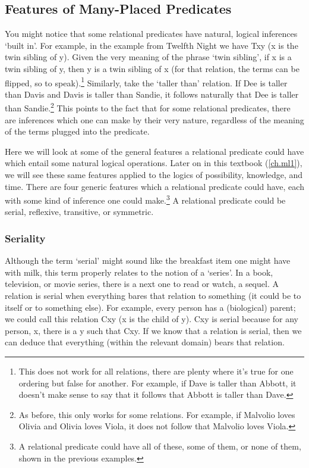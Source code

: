 \subsection{Features of Many-Placed Predicates}\label{ss.featuresmanyplaced}

You might notice that some relational predicates have natural, logical inferences `built in'. For example, in the example from Twelfth Night we have Txy (x is the twin sibling of y). Given the very meaning of the phrase `twin sibling', if x is a twin sibling of y, then y is a twin sibling of x (for that relation, the terms can be flipped, so to speak).\footnote{This does not work for all relations, there are plenty where it's true for one ordering but false for another. For example, if Dave is taller than Abbott, it doesn't make sense to say that it follows that Abbott is taller than Dave.} Similarly, take the `taller than' relation. If Dee is taller than Davis and Davis is taller than Sandie, it follows naturally that Dee is taller than Sandie.\footnote{As before, this only works for some relations. For example, if Malvolio loves Olivia and Olivia loves Viola, it does not follow that Malvolio loves Viola.} This points to the fact that for some relational predicates, there are inferences which one can make by their very nature, regardless of the meaning of the terms plugged into the predicate. 

Here we will look at some of the general features a relational predicate could have which entail some natural logical operations. Later on in this textbook (\ref{ch.ml1}), we will see these same features applied to the logics of possibility, knowledge, and time. There are four generic features which a relational predicate could have, each with some kind of inference one could make.\footnote{A relational predicate could have all of these, some of them, or none of them, shown in the previous examples.} A relational predicate could be serial, reflexive, transitive, or symmetric.

\subsubsection{Seriality}\label{sss.serial}

Although the term `\gls{serial}' might sound like the breakfast item one might have with milk, this term properly relates to the notion of a `series'. In a book, television, or movie series, there is a next one to read or watch, a sequel. A relation is serial when everything bares that relation to something (it could be to itself or to something else). For example, every person has a (biological) parent; we could call this relation Cxy (x is the child of y). Cxy is serial because for any person, x, there is a y such that Cxy. If we know that a relation is serial, then we can deduce that everything (within the relevant domain) bears that relation. 

